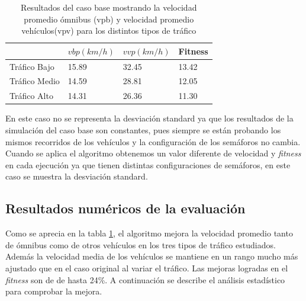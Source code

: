  \begin{table}[H]
 	\renewcommand{\arraystretch}{1.2}
 	\caption{Resultados del caso base mostrando la velocidad promedio ómnibus (vpb) y velocidad promedio vehículos(vpv) para los distintos tipos de tráfico}
 	\label{table:resultado_caso_base}
 	\centering
 	\begin{tabular}{p{2.5cm}p{2.5cm}p{2.5cm}p{2cm} }
 		\hline
 		&
 		$vbp(km/h)$& 
 		$vvp(km/h)$ & 
 		Fitness \\ 
 		\hline
 		Tráfico Bajo & 15.89  & 32.45& 13.42\\
 		Tráfico Medio & 14.59  & 28.81& 12.05\\
 		Tráfico Alto & 14.31  & 26.36& 11.30\\

 		\hline
 	\end{tabular}
 \end{table}
 
 En este caso no se representa la desviación standard ya que los resultados de la simulación del caso base son constantes, pues siempre se están probando los mismos recorridos de los vehículos y la configuración de los semáforos no cambia. Cuando se aplica el algoritmo obtenemos un valor diferente de velocidad y \emph{fitness} en cada ejecución ya que tienen distintas configuraciones de semáforos, en este caso se muestra la desviación standard.


\subsection{Resultados numéricos de la evaluación }

Como se aprecia en la tabla \ref{table:resultado_caso_base}, el algoritmo mejora la velocidad promedio tanto de ómnibus como de otros vehículos en los tres tipos de tráfico estudiados. Además la velocidad media de los vehículos se mantiene en un rango mucho más ajustado que en el caso original al variar el tráfico. Las mejoras logradas en el \emph{fitness} son de de hasta 24\%. A continuación se describe el análisis estadístico para comprobar la mejora.


